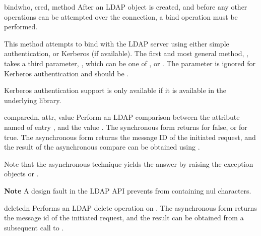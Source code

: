 \begin{methoddesc}[LDAP]{bind}{who, cred, method} %
After an LDAP object is created, and before any other operations can be
attempted over the connection, a bind operation must be performed.

This method attempts to bind with the LDAP server using 
either simple authentication, or Kerberos (if available).
The first and most general method, ,
takes a third parameter, , which can be one of
,  or .
The  parameter is ignored for Kerberos authentication and
should be .

Kerberos authentication support is only available if it is 
available in the underlying library.
\end{methoddesc}


\begin{methoddesc}[LDAP]{compare}{dn, attr, value} %
Perform an LDAP comparison between the attribute named  of 
entry , and the value . The synchronous form
returns  for false, or  for true.
The asynchronous form returns the message ID of the initiated request, 
and the result of the asynchronous compare can be obtained using 
.  

Note that the asynchronous technique yields the answer
by raising the exception objects  or
.

\textbf{Note} A design fault in the LDAP API prevents  
from containing nul characters.
\end{methoddesc}


\begin{methoddesc}[LDAP]{delete}{dn} %
Performs an LDAP delete operation on . The asynchronous form
returns the message id of the initiated request, and the result can be obtained
from a subsequent call to .
\end{methoddesc}

